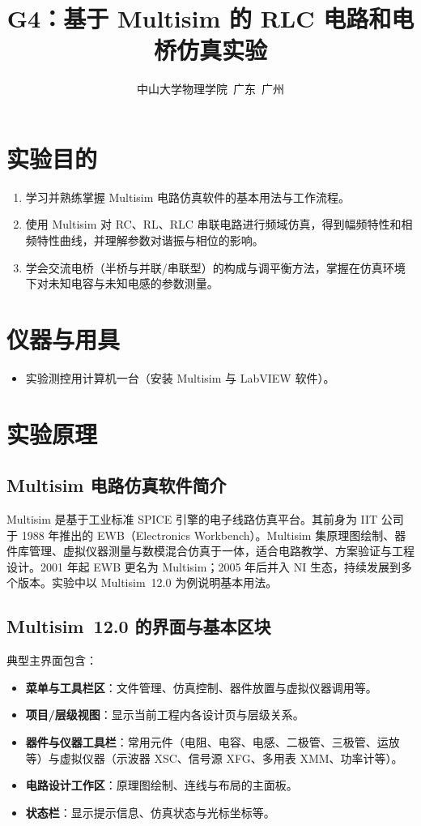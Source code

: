 \documentclass[a4paper,8pt,twocolumn]{article}
\title{
  \textbf{\huge G4：基于 Multisim 的 RLC 电路和电桥仿真实验}}
\author{
\small 中山大学物理学院~广东~广州
}
\begin{document}
\maketitle

\newpage

\section{实验目的}
\begin{enumerate}
  \item 学习并熟练掌握 Multisim 电路仿真软件的基本用法与工作流程。
  \item 使用 Multisim 对 RC、RL、RLC 串联电路进行频域仿真，得到幅频特性和相频特性曲线，并理解参数对谐振与相位的影响。
  \item 学会交流电桥（半桥与并联/串联型）的构成与调平衡方法，掌握在仿真环境下对未知电容与未知电感的参数测量。
\end{enumerate}

\section{仪器与用具}
\begin{itemize}
  \item 实验测控用计算机一台（安装 Multisim 与 LabVIEW 软件）。
\end{itemize}

\section{实验原理}
\subsection{Multisim 电路仿真软件简介}
Multisim 是基于工业标准 SPICE 引擎的电子线路仿真平台。其前身为 IIT 公司于 1988 年推出的 EWB（Electronics Workbench）。Multisim 集原理图绘制、器件库管理、虚拟仪器测量与数模混合仿真于一体，适合电路教学、方案验证与工程设计。2001 年起 EWB 更名为 Multisim；2005 年后并入 NI 生态，持续发展到多个版本。实验中以 Multisim~12.0 为例说明基本用法。

\subsection{Multisim~12.0 的界面与基本区块}
典型主界面包含：
\begin{itemize}
  \item \textbf{菜单与工具栏区}：文件管理、仿真控制、器件放置与虚拟仪器调用等。
  \item \textbf{项目/层级视图}：显示当前工程内各设计页与层级关系。
  \item \textbf{器件与仪器工具栏}：常用元件（电阻、电容、电感、二极管、三极管、运放等）与虚拟仪器（示波器 XSC、信号源 XFG、多用表 XMM、功率计等）。
  \item \textbf{电路设计工作区}：原理图绘制、连线与布局的主面板。
  \item \textbf{状态栏}：显示提示信息、仿真状态与光标坐标等。
\end{itemize}
\end{document}
